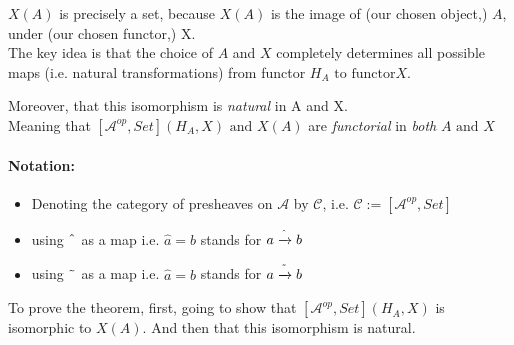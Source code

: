 \documentclass[18pt,a4paper]{article}
\theoremstyle{definition}
\begin{document}
$X(A)$ is precisely a set, because $X(A)$ is the image of (our chosen object,) $A$, under (our chosen functor,) X. \\

The key idea is that the choice of $A$ and $X$ completely determines all possible maps
(i.e. natural transformations) from functor $H_A \text{ to functor} X$.

Moreover, that this isomorphism is \textit{natural} in A and X. \\
Meaning that $[ \mathcal{A}^{op},Set](H_A,X) \text{ and } X(A)$ are
\textit{functorial} in \textit{both} $A \text{ and } X$

\paragraph{Notation:} \begin{itemize}
	\item Denoting the category of presheaves on $\mathcal{A} $ by $\mathcal{C}$,
		i.e. $\mathcal{C}:=[ \mathcal{A} ^{op}, Set] $
	\item using $\string ^ $ as a map i.e. $\hat a = b$ stands for $a \xrightarrow{\string ^} b$
	\item using $\string ~ $ as a map i.e. $\hat a = b$ stands for $a \xrightarrow{\string ~} b$
\end{itemize}

To prove the theorem, first,
going to show that $[ \mathcal{A} ^{op}, Set](H_A,X)$ is isomorphic to $X(A)$. And then that
this isomorphism is natural.
\end{document}
